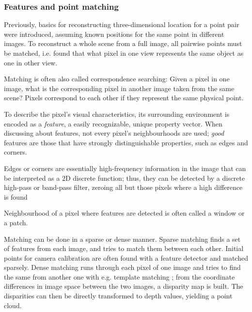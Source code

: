 \subsubsection{Features and point matching} %


Previously, basics for reconstructing three-dimensional location for a point pair were introduced, assuming known positions for the same point in different images.
To reconstruct a whole scene from a full image, all pairwise points must be matched, i.e. found that what pixel in one view represents the same object as one in other view.

Matching is often also called correspondence searching:
Given a pixel in one image, what is the corresponding pixel in another image taken from the same scene?
Pixels correspond to each other if they represent the same physical point.


To describe the pixel's visual characteristics, its surrounding environment is encoded as a \textit{feature}, a easily recognizable, unique property vector.
When discussing about features, not every pixel's neighbourhoods are used; \textit{good} features are those that have strongly distinguishable properties, such as edges and corners.

Edges or corners are essentially high-frequency information in the image that can be interpreted as a 2D discrete function; thus, they can be detected by a discrete high-pass or band-pass filter, zeroing all but those pixels where a high difference is found \cite{marr1980theory}

Neighbourhood of a pixel where features are detected is often called a window or a patch.

Matching can be done in a sparse or dense manner.
Sparse matching finds a set of features from each image, and tries to match them between each other.
Initial points for camera calibration are often found with a feature detector and matched sparsely.
Dense matching runs through each pixel of one image and tries to find the same from another one with e.g. template matching \cite{duda1973pattern}; from the coordinate differences in image space between the two images, a disparity map is built.
The disparities can then be directly transformed to depth values, yielding a point cloud.

